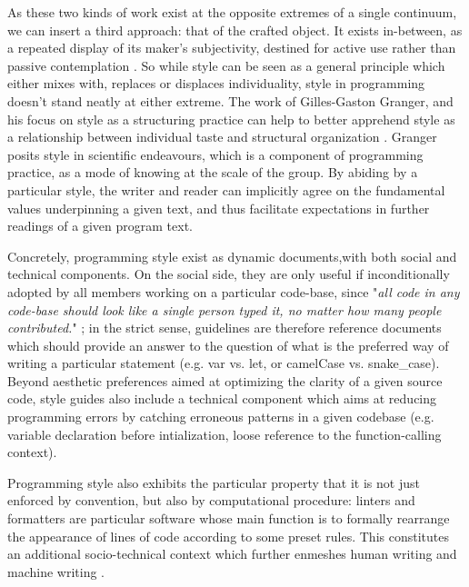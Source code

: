 As these two kinds of work exist at the opposite extremes of a single continuum, we can insert a third approach: that of the crafted object. It exists in-between, as a repeated display of its maker's subjectivity, destined for active use rather than passive contemplation \citep{sennett_craftsman_2009}. So while style can be seen as a general principle which either mixes with, replaces or displaces individuality, style in programming doesn't stand neatly at either extreme. The work of Gilles-Gaston Granger, and his focus on style as a structuring practice can help to better apprehend style as a relationship between individual taste and structural organization \citep{granger_essai_1988}. Granger posits style in scientific endeavours, which is a component of programming practice, as a mode of knowing at the scale of the group. By abiding by a particular style, the writer and reader can implicitly agree on the fundamental values underpinning a given text, and thus facilitate expectations in further readings of a given program text.

Concretely, programming style exist as dynamic documents,with both social and technical components. On the social side, they are only useful if inconditionally adopted by all members working on a particular code-base, since "\emph{all code in any code-base should look like a single person typed it, no matter how many people contributed.}" \citep{waldron_idiomatic_2020}; in the strict sense, guidelines are therefore reference documents which should provide an answer to the question of what is the preferred way of writing a particular statement (e.g. var vs. let, or camelCase vs. snake\_case). Beyond aesthetic preferences aimed at optimizing the clarity of a given source code, style guides also include a technical component which aims at reducing programming errors by catching erroneous patterns in a given codebase (e.g. variable declaration before intialization, loose reference to the function-calling context).

Programming style also exhibits the particular property that it is not just enforced by convention, but also by computational procedure: linters and formatters are particular software whose main function is to formally rearrange the appearance of lines of code according to some preset rules. This constitutes an additional socio-technical context which further enmeshes human writing and machine writing \citep{depaz_discursive_2022}.


